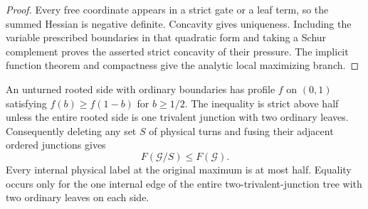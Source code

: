\begin{proof}
Every free coordinate appears in a strict gate or a leaf term, so
the summed Hessian is negative definite. Concavity gives uniqueness.
Including the variable prescribed boundaries in that quadratic form
and taking a Schur complement proves the asserted strict concavity
of their pressure. The implicit function theorem and compactness
give the analytic local maximizing branch.
\end{proof}

\begin{lemma}\label{ms:deletion}
An unturned rooted side with ordinary boundaries has profile $f$ on
$(0,1)$ satisfying $f(b)\ge f(1-b)$ for $b\ge1/2$.
The inequality is strict above half unless the entire rooted side
is one trivalent junction with two ordinary leaves. Consequently
deleting any set $S$ of physical turns and fusing their adjacent
ordered junctions gives
\begin{equation}\label{ms:pressure-deletion}
 F(\mathcal G/S)\le F(\mathcal G).
\end{equation}
Every internal physical label at the original maximum is at most
half. Equality occurs only for the one internal edge of the entire
two-trivalent-junction tree with two ordinary leaves on each side.
\end{lemma}
